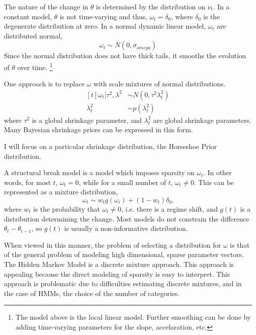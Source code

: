 \documentclass{article}
\begin{document}
The nature of the change in $\theta$ is determined by the distribution on $\nu_t$.  
 In a constant model, $\theta$ is not time-varying and thus, $\omega_{t} = \delta_{0}$, where $\delta_{0}$ is the degenerate distribution at zero.
In a normal dynamic linear model, $\omega_{t}$ are distributed normal, 
\begin{equation}
  \label{eq:2}
  \omega_{t} \sim N(0, \sigma_{omega})
\end{equation}
Since the normal distribution does not have thick tails, it smooths the evolution of $\theta$ over time.
\footnote{
  The model above is the local linear model. 
  Further smoothing can be done by adding time-varying parameters for the slope, accelaration, etc.
}

One approach is to replace $\omega$ with scale mixtures of normal distributions.
\begin{equation}
  \label{eq:6}
  \begin{aligned}[t]
    \omega_{t} | \tau^{2}, \lambda^{2} & \sim N(0, \tau^{2} \lambda_{t}^{2}) \\
    \lambda_{t}^{2} & \sim p(\lambda^{2}_{t})
  \end{aligned}
\end{equation}
where $\tau^{2}$ is a global shrinkage parameter, and $\lambda_{t}^{2}$ are global shrinkage parameters.
Many Bayesian shrinkage priors can be expressed in this form. 

I will focus on a particular shrinkage distribution, the Horseshoe Prior distribution.

A structural break model is a model which imposes sparsity on $\omega_{t}$. 
In other words, for most $t$, $\omega_{t} = 0$, while for a small number of $t$, $\omega_{t} \neq 0$.
This can be represented as a mixture distribution,
\begin{equation}
  \label{eq:1}
  \omega_{t} \sim w_{t} g(\omega_{i}) + (1 - w_{t}) \delta_{0} \text{,}
\end{equation}
where $w_{t}$ is the probability that $\omega_{t} \neq 0$, i.e. there is a regime shift, and 
$g(t)$ is a distribution determining the change. Most models do not constrain the difference $\theta_{t} - \theta_{t-1}$, so 
$g(t)$ is usually a non-informative distribution.

When viewed in this manner, the problem of selecting a distribution for $\omega$ is that of the general problem of modeling high dimensional, sparse parameter vectors.
The Hidden Markov Model is a discrete mixture approach. 
This approach is appealing because the direct modeling of sparsity is easy to interpret. 
This approach is problematic due to difficulties estimating discrete mixtures, and in the case of HMMs, the choice of the number of categories.
\end{document}
